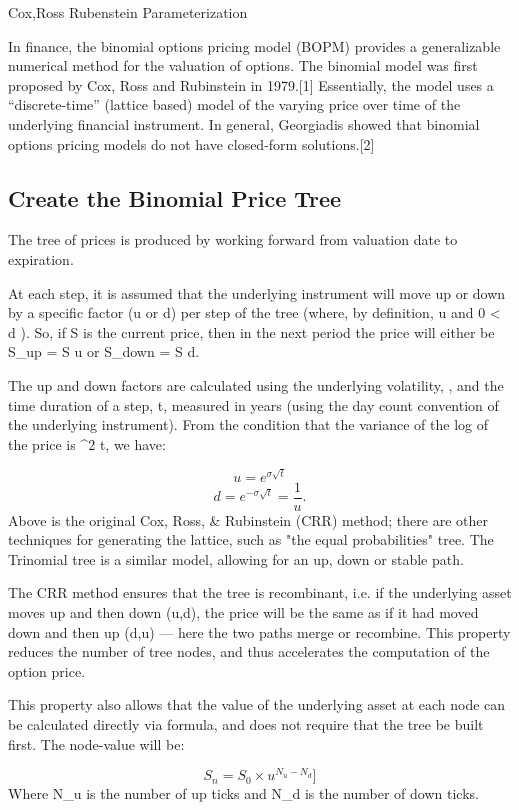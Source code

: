 Cox,Ross Rubenstein Parameterization

In finance, the binomial options pricing model (BOPM) provides a generalizable numerical method for the valuation of options. The binomial model was first proposed by Cox, Ross and Rubinstein in 1979.[1] Essentially, the model uses a “discrete-time” (lattice based) model of the varying price over time of the underlying financial instrument. 
In general, Georgiadis showed that binomial options pricing models do not have closed-form solutions.[2]


\subsection{Create the Binomial Price Tree}
The tree of prices is produced by working forward from valuation date to expiration.

At each step, it is assumed that the underlying instrument will move up or down by a specific factor (u or d) per step of the tree (where, by definition, u  and 0 < d  ). So, if S is the current price, then in the next period the price will either be S_{up} = S \cdot u or S_{down} = S \cdot d.

The up and down factors are calculated using the underlying volatility, \sigma, and the time duration of a step, t, measured in years (using the day count convention of the underlying instrument). From the condition that the variance of the log of the price is \sigma^2 t, we have:

\[u = e^{\sigma\sqrt t}\]
\[d = e^{-\sigma\sqrt t} = \frac{1}{u}.\]
Above is the original Cox, Ross, & Rubinstein (CRR) method; there are other techniques for generating the lattice, such as "the equal probabilities" tree. The Trinomial tree is a similar model, allowing for an up, down or stable path.

The CRR method ensures that the tree is recombinant, i.e. if the underlying asset moves up and then down (u,d), the price will be the same as if it had moved down and then up (d,u) — here the two paths merge or recombine. This property reduces the number of tree nodes, and thus accelerates the computation of the option price.

This property also allows that the value of the underlying asset at each node can be calculated directly via formula, and does not require that the tree be built first. The node-value will be:

\[S_n = S_0 \times u ^{N_u - N_d}]\]
Where N_u is the number of up ticks and N_d is the number of down ticks.

